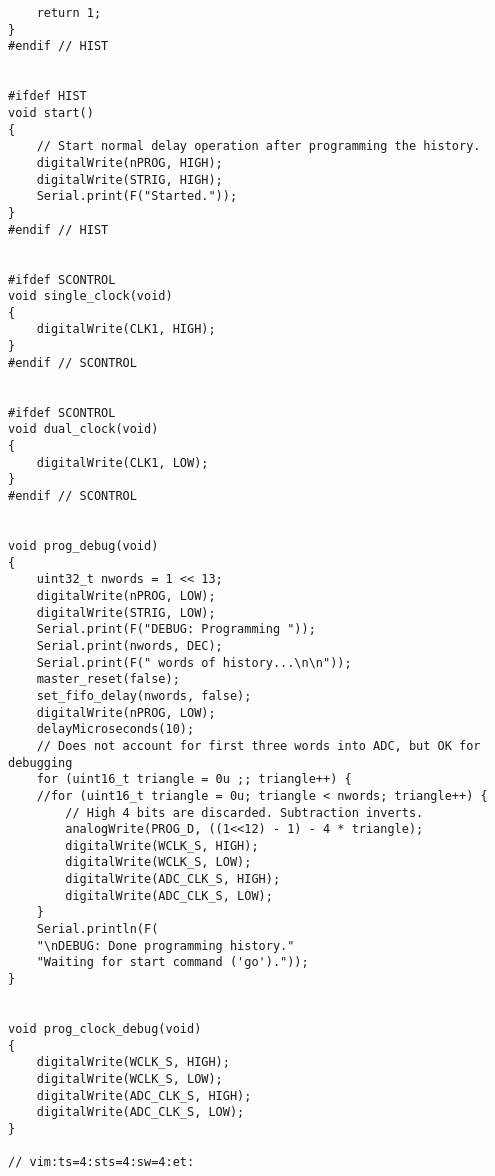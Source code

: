 \documentclass[11pt,letterpaper]{article}
\begin{document}
\begin{verbatim}
    return 1;
}
#endif // HIST


#ifdef HIST
void start()
{
    // Start normal delay operation after programming the history.
    digitalWrite(nPROG, HIGH);
    digitalWrite(STRIG, HIGH);
    Serial.print(F("Started."));
}
#endif // HIST


#ifdef SCONTROL
void single_clock(void)
{
    digitalWrite(CLK1, HIGH);
}
#endif // SCONTROL


#ifdef SCONTROL
void dual_clock(void)
{
    digitalWrite(CLK1, LOW);
}
#endif // SCONTROL


void prog_debug(void)
{
    uint32_t nwords = 1 << 13;
    digitalWrite(nPROG, LOW);
    digitalWrite(STRIG, LOW);
    Serial.print(F("DEBUG: Programming "));
    Serial.print(nwords, DEC);
    Serial.print(F(" words of history...\n\n"));
    master_reset(false);
    set_fifo_delay(nwords, false);
    digitalWrite(nPROG, LOW);
    delayMicroseconds(10);
    // Does not account for first three words into ADC, but OK for debugging
    for (uint16_t triangle = 0u ;; triangle++) {
    //for (uint16_t triangle = 0u; triangle < nwords; triangle++) {
        // High 4 bits are discarded. Subtraction inverts.
        analogWrite(PROG_D, ((1<<12) - 1) - 4 * triangle);
        digitalWrite(WCLK_S, HIGH);
        digitalWrite(WCLK_S, LOW);
        digitalWrite(ADC_CLK_S, HIGH);
        digitalWrite(ADC_CLK_S, LOW);
    }
    Serial.println(F(
    "\nDEBUG: Done programming history."
    "Waiting for start command ('go')."));
}


void prog_clock_debug(void)
{
    digitalWrite(WCLK_S, HIGH);
    digitalWrite(WCLK_S, LOW);
    digitalWrite(ADC_CLK_S, HIGH);
    digitalWrite(ADC_CLK_S, LOW);
}

// vim:ts=4:sts=4:sw=4:et:
\end{verbatim}
\end{document}
